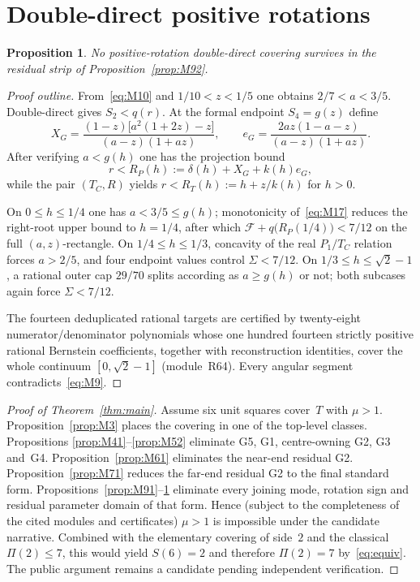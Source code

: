 \documentclass[11pt,reqno]{amsart}
\newtheorem{proposition}[theorem]{Proposition}
\theoremstyle{definition}
\begin{document}
\section{Double-direct positive rotations}\label{sec:finale}

\begin{proposition}\label{prop:M111}
No positive-rotation double-direct covering survives in the residual strip of
Proposition~\ref{prop:M92}.
\end{proposition}

\begin{proof}[Proof outline]
From~\eqref{eq:M10} and $1/10<z<1/5$ one obtains $2/7<a<3/5$.  Double-direct
gives $S_2<q(r)$.  At the formal endpoint $S_4=g(z)$ define
\begin{equation}\label{eq:M16}
X_G=\frac{(1-z)\bigl[a^2(1+2z)-z\bigr]}{(a-z)(1+az)},\qquad
e_G=\frac{2az(1-a-z)}{(a-z)(1+az)}.
\end{equation}
After verifying $a<g(h)$ one has the projection bound
\begin{equation}\label{eq:M17}
r<R_P(h):=\delta(h)+X_G+k(h)e_G,
\end{equation}
while the pair $(T_C,R)$ yields $r<R_T(h):=h+z/k(h)$ for $h>0$.

On $0\le h\le 1/4$ one has $a<3/5\le g(h)$; monotonicity of~\eqref{eq:M17}
reduces the right-root upper bound to $h=1/4$, after which
$\mathcal F+q\bigl(R_P(1/4)\bigr)<7/12$ on the full $(a,z)$-rectangle.
On $1/4\le h\le 1/3$, concavity of the real $P_1/T_C$ relation forces $a>2/5$,
and four endpoint values control $\Sigma<7/12$.  On
$1/3\le h\le\sqrt2-1$, a rational outer cap $29/70$ splits according as
$a\ge g(h)$ or not; both subcases again force $\Sigma<7/12$.

The fourteen deduplicated rational targets are certified by twenty-eight
numerator/denominator polynomials whose one hundred fourteen strictly positive
rational Bernstein coefficients, together with reconstruction identities, cover
the whole continuum $[0,\sqrt2-1]$ (module~R64).  Every angular segment
contradicts~\eqref{eq:M9}.
\end{proof}

\begin{proof}[Proof of Theorem~\ref{thm:main}]
Assume six unit squares cover~$T$ with $\mu>1$.  Proposition~\ref{prop:M3}
places the covering in one of the top-level classes.  Propositions
\ref{prop:M41}--\ref{prop:M52} eliminate G5, G1, centre-owning G2, G3 and~G4.
Proposition~\ref{prop:M61} eliminates the near-end residual G2.
Proposition~\ref{prop:M71} reduces the far-end residual G2 to the final
standard form.  Propositions~\ref{prop:M91}--\ref{prop:M111} eliminate every
joining mode, rotation sign and residual parameter domain of that form.
Hence (subject to the completeness of the cited modules and certificates)
$\mu>1$ is impossible under the candidate narrative.  Combined with the
elementary covering of side~$2$ and the classical $\Pi(2)\le 7$, this would
yield $S(6)=2$ and therefore $\Pi(2)=7$ by~\eqref{eq:equiv}.  The public
argument remains a candidate pending independent verification.
\end{proof}
\end{document}
